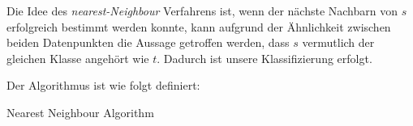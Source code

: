 \documentclass[fontsize=11pt]{scrartcl}
\begin{document}
                Die Idee des \emph{nearest-Neighbour} Verfahrens ist, wenn der nächste Nachbarn von $s$ erfolgreich bestimmt werden konnte, kann aufgrund der Ähnlichkeit zwischen beiden Datenpunkten die Aussage getroffen werden, dass $s$ vermutlich der gleichen Klasse angehört wie $t$. Dadurch ist unsere Klassifizierung erfolgt.\par
                Der Algorithmus ist wie folgt definiert:\par
                \begin{algorithm}[H]
                        {
                            \KwRet{-}\;
                        }
                    \caption{Nearest Neighbour Algorithm}
                \end{algorithm}
                        
\end{document}
